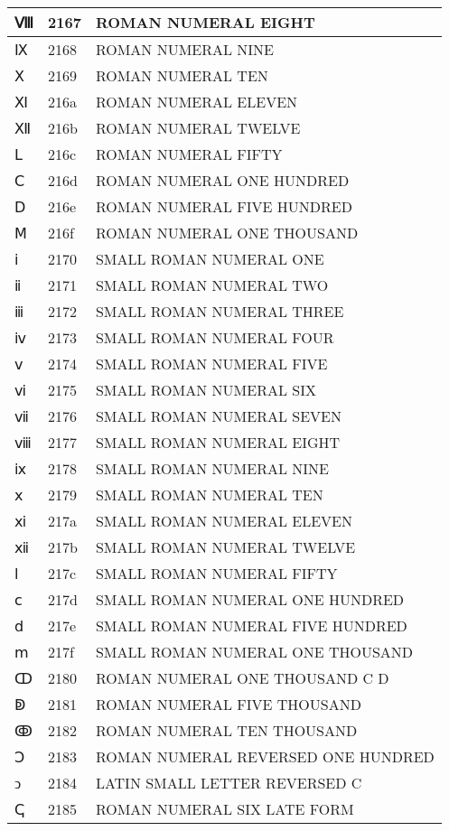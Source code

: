 \documentclass[12pt,letterpaper,openany]{book}
\begin{document}
\begin{center}
\begin{supertabular}{|m{0.25in}|m{0.5in}|m{4in}|}
Ⅷ & 2167 & ROMAN NUMERAL EIGHT\\\hline
Ⅸ & 2168 & ROMAN NUMERAL NINE\\\hline
Ⅹ & 2169 & ROMAN NUMERAL TEN\\\hline
Ⅺ & 216a & ROMAN NUMERAL ELEVEN\\\hline
Ⅻ & 216b & ROMAN NUMERAL TWELVE\\\hline
Ⅼ & 216c & ROMAN NUMERAL FIFTY\\\hline
Ⅽ & 216d & ROMAN NUMERAL ONE HUNDRED\\\hline
Ⅾ & 216e & ROMAN NUMERAL FIVE HUNDRED\\\hline
Ⅿ & 216f & ROMAN NUMERAL ONE THOUSAND\\\hline
ⅰ & 2170 & SMALL ROMAN NUMERAL ONE\\\hline
ⅱ & 2171 & SMALL ROMAN NUMERAL TWO\\\hline
ⅲ & 2172 & SMALL ROMAN NUMERAL THREE\\\hline
ⅳ & 2173 & SMALL ROMAN NUMERAL FOUR\\\hline
ⅴ & 2174 & SMALL ROMAN NUMERAL FIVE\\\hline
ⅵ & 2175 & SMALL ROMAN NUMERAL SIX\\\hline
ⅶ & 2176 & SMALL ROMAN NUMERAL SEVEN\\\hline
ⅷ & 2177 & SMALL ROMAN NUMERAL EIGHT\\\hline
ⅸ & 2178 & SMALL ROMAN NUMERAL NINE\\\hline
ⅹ & 2179 & SMALL ROMAN NUMERAL TEN\\\hline
ⅺ & 217a & SMALL ROMAN NUMERAL ELEVEN\\\hline
ⅻ & 217b & SMALL ROMAN NUMERAL TWELVE\\\hline
ⅼ & 217c & SMALL ROMAN NUMERAL FIFTY\\\hline
ⅽ & 217d & SMALL ROMAN NUMERAL ONE HUNDRED\\\hline
ⅾ & 217e & SMALL ROMAN NUMERAL FIVE HUNDRED\\\hline
ⅿ & 217f & SMALL ROMAN NUMERAL ONE THOUSAND\\\hline
ↀ & 2180 & ROMAN NUMERAL ONE THOUSAND C D\\\hline
ↁ & 2181 & ROMAN NUMERAL FIVE THOUSAND\\\hline
ↂ & 2182 & ROMAN NUMERAL TEN THOUSAND\\\hline
Ↄ & 2183 & ROMAN NUMERAL REVERSED ONE HUNDRED\\\hline
ↄ & 2184 & LATIN SMALL LETTER REVERSED C\\\hline
ↅ & 2185 & ROMAN NUMERAL SIX LATE FORM\\\hline

\end{supertabular}
\end{center}
\end{document}
